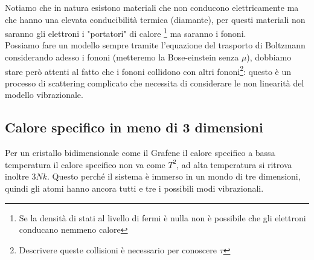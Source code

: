 Notiamo che in natura esistono materiali che non conducono elettricamente ma che hanno una elevata conducibilità termica (diamante), per questi materiali non saranno gli elettroni i "portatori" di calore \footnote{Se la densità di stati al livello di fermi è nulla non è possibile che gli elettroni conducano nemmeno calore} ma saranno i fononi. \\
Possiamo fare un modello sempre tramite l'equazione del trasporto di Boltzmann considerando adesso i fononi (metteremo la Bose-einstein senza $\mu $), dobbiamo stare però attenti al fatto che i fononi collidono con altri fononi\footnote{Descrivere queste collisioni è necessario per conoscere $\tau$}: questo è un processo di scattering complicato che necessita di considerare le non linearità del modello vibrazionale.
\subsection{Calore specifico in meno di 3 dimensioni}
\label{subsec:Calore specifico in meno di 3 dimensioni}
Per un cristallo bidimensionale come il Grafene il calore specifico a bassa temperatura il calore specifico non va come $T^2$, ad alta temperatura si ritrova inoltre $3Nk$.
Questo perché il sistema è immerso in un mondo di tre dimensioni, quindi gli atomi hanno ancora tutti e tre i possibili modi vibrazionali.
